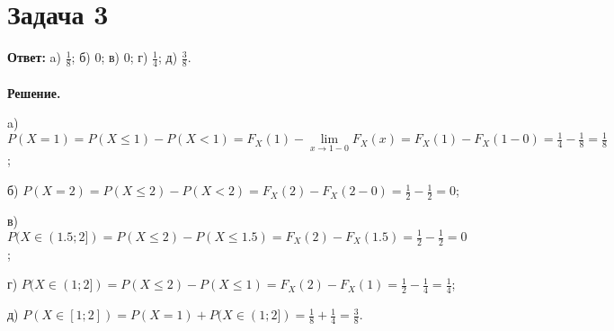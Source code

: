 \documentclass{article}
\begin{document}
\section*{Задача 3}
{\bf Ответ: } a) $\frac{1}{8}$; б) $0$; в) $0$; г) $\frac{1}{4}$; д) $\frac{3}{8}$.
\\
\\
{\bf Решение.}
\par
a) $P(X=1)=P(X \leq 1) - P(X < 1) = F_X(1)-\lim\limits_{x\to 1-0}F_X(x)=F_X(1)-F_X(1-0)=\frac{1}{4}-\frac{1}{8}=\frac{1}{8}$;
\par
б) $P(X=2)=P(X \leq 2) - P(X < 2) = F_X(2)-F_X(2-0)=\frac{1}{2}-\frac{1}{2}=0$;
\par
в) $P(X \in (1.5; 2]) = P(X \leq 2) - P(X \leq 1.5) = F_X(2)-F_X(1.5)=\frac{1}{2}-\frac{1}{2}=0$;
\par
г) $P(X \in (1; 2]) = P(X \leq 2) - P(X \leq 1) = F_X(2) - F_X(1) = \frac{1}{2} - \frac{1}{4}=\frac{1}{4}$;
\par
д) $P(X \in [1; 2])=P(X=1) + P(X \in (1; 2]) = \frac{1}{8} + \frac{1}{4} = \frac{3}{8}$.
\end{document}
